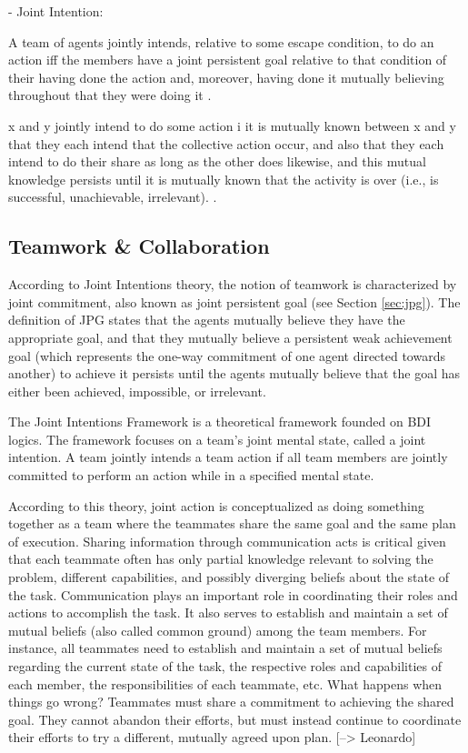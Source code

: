 \documentclass[11pt]{article}
\begin{document}
- Joint Intention:

A team of agents jointly intends, relative to some escape condition, to do an
action iff the members have a joint persistent goal relative to that condition
of their having done the action and, moreover, having done it mutually believing
throughout that they were doing it \cite{cohen:teamwork}.

x and y jointly intend to do some action i it is mutually known between x and y
that they each intend that the collective action occur, and also that they each
intend to do their share as long as the other does likewise, and this mutual
knowledge persists until it is mutually known that the activity is over (i.e.,
is successful, unachievable, irrelevant). \cite{cohen:team-formation}.



\subsection{Teamwork \& Collaboration}

According to Joint Intentions theory, the notion of teamwork is characterized by
joint commitment, also known as joint persistent goal (see Section
\ref{sec:jpg}). The definition of JPG states that the agents mutually believe
they have the appropriate goal, and that they mutually believe a persistent weak
achievement goal (which represents the one-way commitment of one agent directed
towards another) to achieve it persists until the agents mutually believe that
the goal has either been achieved, impossible, or irrelevant.



The Joint Intentions Framework \cite{levesque:acting-together}
\cite{cohen:intention-commitment} \cite{cohen:persistence-intention-commitment}
is a theoretical framework founded on BDI logics. The framework focuses on a
team's joint mental state, called a joint intention. A team jointly intends a
team action if all team members are jointly committed to perform an action while
in a specified mental state.

According to this theory, joint action is conceptualized as doing something
together as a team where the teammates share the same goal and the same plan of
execution. Sharing information through communication acts is critical given that
each teammate often has only partial knowledge relevant to solving the problem,
different capabilities, and possibly diverging beliefs about the state of the
task. Communication plays an important role in coordinating their roles and
actions to accomplish the task. It also serves to establish and maintain a set
of mutual beliefs (also called common ground) among the team members. For
instance, all teammates need to establish and maintain a set of mutual beliefs
regarding the current state of the task, the respective roles and capabilities
of each member, the responsibilities of each teammate, etc. What happens when
things go wrong? Teammates must share a commitment to achieving the shared goal.
They cannot abandon their efforts, but must instead continue to coordinate their
efforts to try a different, mutually agreed upon plan. [--> Leonardo]
\end{document}
